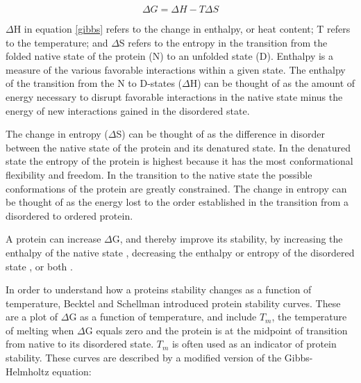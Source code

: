 \begin{equation}\label{gibbs}
  \Delta G = \Delta H - T \Delta S
\end{equation}

$\Delta$H in equation \eqref{gibbs} refers to the change in enthalpy, or heat
content; T refers to the temperature; and $\Delta$S refers to the entropy in
the transition from the folded native state of the protein (N) to an unfolded state
(D).  Enthalpy is a measure of the various favorable interactions within a
given state.  The enthalpy of the transition from the N to D-states ($\Delta$H)
can be thought of as the amount of energy necessary to disrupt favorable
interactions in the native state minus the energy of new interactions
gained in the disordered state.


The change in entropy ($\Delta$S) can be thought of as the difference in disorder between
the native state of the protein and its denatured state. In the denatured state
the entropy of the protein is highest because it has the most conformational
flexibility and freedom.  In the transition to the native state the possible
conformations of the protein are greatly constrained. The change in entropy can
be thought of as the energy lost to the order established in the transition
from a disordered to ordered protein.


A protein can increase $\Delta$G, and thereby improve its stability, by 
increasing the enthalpy of the native state \cite{119}, decreasing the enthalpy or
entropy of the disordered state \cite{120,121}, or both \cite{122,123}. 

In order to understand how a proteins stability changes as a function of
temperature, Becktel and Schellman \cite{becktel1987psc} introduced protein
stability curves.  These are a plot of $\Delta$G as a function of temperature,
and include ${T}_{m}$, the temperature of melting when $\Delta$G equals zero
and the protein is at the midpoint of transition from native to its disordered
state. ${T}_{m}$ is often used as an indicator of protein stability.  These
curves are described by a modified version of the Gibbs-Helmholtz equation:

